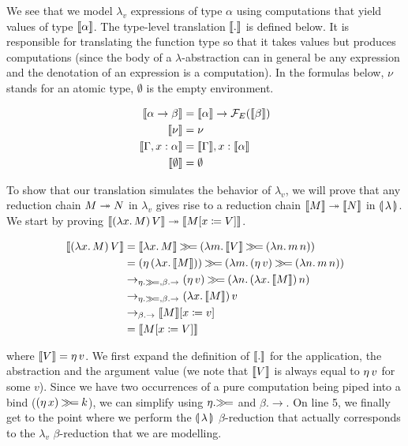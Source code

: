 We see that we model $\lambda_v$ expressions of type $\alpha$ using
computations that yield values of type $\llbracket \alpha \rrbracket$. The type-level
translation $\llbracket . \rrbracket$ is defined below. It is responsible for translating
the function type so that it takes values but produces computations (since
the body of a $\lambda$-abstraction can in general be any expression and
the denotation of an expression is a computation). In the formulas below,
$\nu$ stands for an atomic type, $\emptyset$ is the empty environment.

\begin{align*}
  \llbracket \alpha \to \beta \rrbracket &= \llbracket \alpha \rrbracket \to \mathcal{F}_E(\llbracket \beta \rrbracket) \\
  \llbracket \nu \rrbracket &= \nu \\
  \llbracket \Gamma, x: \alpha \rrbracket &= \llbracket \Gamma \rrbracket, x: \llbracket \alpha \rrbracket \\
  \llbracket \emptyset \rrbracket &= \emptyset
\end{align*}

To show that our translation simulates the behavior of $\lambda_v$, we will
prove that any reduction chain $M \twoheadrightarrow N$ in $\lambda_v$ gives rise to a
reduction chain $\llbracket M \rrbracket \twoheadrightarrow \llbracket N \rrbracket$ in $\llparenthesis \, \lambda \, \rrparenthesis$. We start by
proving $\llbracket (\lambda x.\, M)\,V \rrbracket \twoheadrightarrow \llbracket M[x \coloneqq V] \rrbracket$.

\begin{align*}
  \llbracket (\lambda x.\, M)\,V \rrbracket
&= \llbracket \lambda x.\, M \rrbracket \mathbin{\gg\!=} (\lambda m.\, \llbracket V \rrbracket \mathbin{\gg\!=} (\lambda n.\, m\,n)) \\
&= (\eta\,(\lambda x.\, \llbracket M \rrbracket)) \mathbin{\gg\!=} (\lambda m.\, (\eta\,v) \mathbin{\gg\!=} (\lambda n.\, m\,n)) \\
&\to_{\eta.\mathbin{\gg\!=},\beta.\to} (\eta\,v) \mathbin{\gg\!=} (\lambda n.\, (\lambda x.\, \llbracket M \rrbracket)\,n) \\
&\to_{\eta.\mathbin{\gg\!=},\beta.\to} (\lambda x.\, \llbracket M \rrbracket)\,v \\
&\to_{\beta.\to} \llbracket M \rrbracket[x \coloneqq v] \\
&= \llbracket M[x \coloneqq V] \rrbracket
\end{align*}

where $\llbracket V \rrbracket = \eta\,v$. We first expand the definition of $\llbracket . \rrbracket$
for the application, the abstraction and the argument value (we note that
$\llbracket V \rrbracket$ is always equal to $\eta\,v$ for some $v$). Since we have
two occurrences of a pure computation being piped into a bind
($(\eta\,x) \mathbin{\gg\!=} k$), we can simplify using $\eta.\mathbin{\gg\!=}$ and
$\beta.\to$. On line 5, we finally get to the point where we perform the
$\llparenthesis \, \lambda \, \rrparenthesis$ $\beta$-reduction that actually corresponds to the
$\lambda_v$ $\beta$-reduction that we are modelling.

